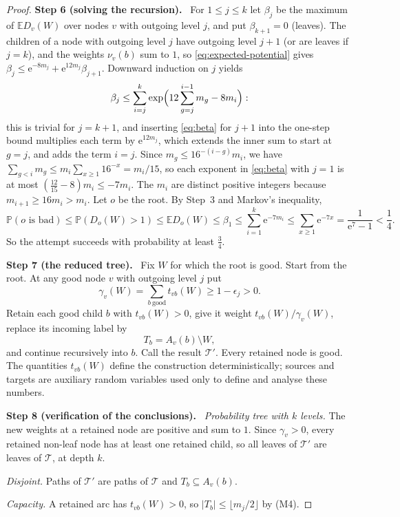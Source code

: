 \documentclass[11pt]{article}
\numberwithin{equation}{section}
\newcommand{\PP}{\mathbb P}
\newcommand{\EE}{\mathbb E}
\newcommand{\TT}{\mathcal T}
\newcommand{\ee}{\mathrm e}
\newcommand{\step}[2]{\par\medskip\noindent\textbf{Step #1 (#2).}\ }
\begin{document}
\begin{proof}
\step{6}{solving the recursion}
For $1\le j\le k$ let $\beta_j$ be the maximum of $\EE D_v(W)$ over
nodes $v$ with outgoing level $j$, and put $\beta_{k+1}=0$ (leaves).
The children of a node with outgoing level $j$ have outgoing level
$j+1$ (or are leaves if $j=k$), and the weights $\nu_v(b)$ sum to $1$,
so \eqref{eq:expected-potential} gives
$\beta_j\le\ee^{-8m_j}+\ee^{12m_j}\beta_{j+1}$. Downward induction on
$j$ yields
\begin{equation}\label{eq:beta}
 \beta_j\le
 \sum_{i=j}^k
 \exp\Bigl(12\sum_{g=j}^{i-1}m_g-8m_i\Bigr):
\end{equation}
this is trivial for $j=k+1$, and inserting \eqref{eq:beta} for $j+1$
into the one-step bound multiplies each term by $\ee^{12m_j}$, which
extends the inner sum to start at $g=j$, and adds the term $i=j$. Since
$m_g\le16^{-(i-g)}m_i$, we have
$\sum_{g<i}m_g\le m_i\sum_{x\ge1}16^{-x}=m_i/15$, so each exponent in
\eqref{eq:beta} with $j=1$ is at most
$(\frac{12}{15}-8)m_i\le-7m_i$. The $m_i$ are distinct positive
integers because $m_{i+1}\ge16m_i>m_i$. Let $o$ be the root. By Step~3
and Markov's inequality,
\[
 \PP(o\text{ is bad})\le\PP(D_o(W)>1)\le\EE D_o(W)\le\beta_1
 \le\sum_{i=1}^k\ee^{-7m_i}
 \le\sum_{x\ge1}\ee^{-7x}=\frac1{\ee^7-1}<\frac14 .
\]
So the attempt succeeds with probability at least $\frac34$.

\step{7}{the reduced tree}
Fix $W$ for which the root is good. Start from the root. At any good
node $v$ with outgoing level $j$ put
\[
 \gamma_v(W)=\sum_{b\ \mathrm{good}}t_{vb}(W)\ge1-\epsilon_j>0 .
\]
Retain each good child $b$ with $t_{vb}(W)>0$, give it weight
$t_{vb}(W)/\gamma_v(W)$, replace its incoming label by
\[
 T_b=A_v(b)\setminus W,
\]
and continue recursively into $b$. Call the result $\TT'$. Every
retained node is good. The quantities $t_{vb}(W)$ define the
construction deterministically; sources and targets are auxiliary
random variables used only to define and analyse these numbers.

\step{8}{verification of the conclusions}
\emph{Probability tree with $k$ levels.} The new weights at a retained
node are positive and sum to $1$. Since $\gamma_v>0$, every retained
non-leaf node has at least one retained child, so all leaves of $\TT'$
are leaves of $\TT$, at depth $k$.

\emph{Disjoint.} Paths of $\TT'$ are paths of $\TT$ and
$T_b\subseteq A_v(b)$.

\emph{Capacity.} A retained arc has $t_{vb}(W)>0$, so
$|T_b|\le\lfloor m_j/2\rfloor$ by (M4).


\end{proof}
\end{document}
